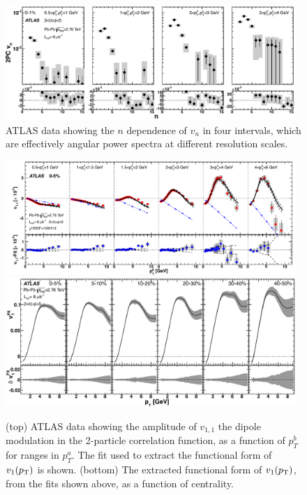 \begin{figure}[!htb]
\begin{center}
\includegraphics[width=0.98\textwidth]{flowcorrelations_figs/atlas_vn_fig_13.pdf}
\caption[]{
ATLAS data showing the $n$ dependence of $v_n$ in four \pT intervals, which are effectively
angular power spectra at different resolution scales.
}
\label{fig:pas:fc:powerspec}
\end{center}
\end{figure}

\begin{figure}[!htb]
\begin{center}
\includegraphics[width=0.98\textwidth]{flowcorrelations_figs/atlas_vn_fig_20a.pdf}
\includegraphics[width=0.98\textwidth]{flowcorrelations_figs/atlas_vn_fig_21.pdf}
\caption[]{
(top) ATLAS data showing the amplitude of $v_{1,1}$ the dipole modulation in the 2-particle correlation function, as a function of $p^b_T$ for ranges in $p^a_T$.  The fit used to extract the functional form of $v_1(\mbox{$p_{\mathrm{T}}$})$ is shown.
(bottom) The extracted functional form of $v_1(\mbox{$p_{\mathrm{T}}$})$, from the fits shown above, as a function of centrality.
}
\label{fig:pas:fc:v1}
\end{center}
\end{figure}

